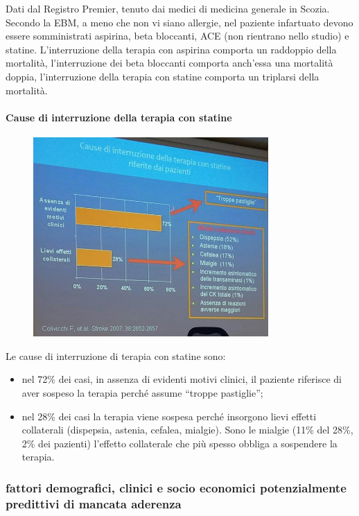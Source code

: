 Dati dal Registro Premier, tenuto dai medici di medicina generale in
Scozia. Secondo la EBM, a meno che non vi siano allergie, nel paziente
infartuato devono essere somministrati aspirina, beta bloccanti, ACE
(non rientrano nello studio) e statine. L'interruzione della terapia con
aspirina comporta un raddoppio della mortalità, l'interruzione dei beta
bloccanti comporta anch'essa una mortalità doppia, l'interruzione della
terapia con statine comporta un triplarsi della mortalità.

\paragraph{Cause di interruzione della terapia con statine}

\begin{figure}[!ht]
\centering
	\includegraphics[width=0.8\textwidth]{41/image4.jpeg}
	\end{figure}
	
Le cause di interruzione di terapia con statine sono:

\begin{itemize}
\item
  nel 72\% dei casi, in assenza di evidenti motivi clinici, il paziente
  riferisce di aver sospeso la terapia perché assume ``troppe
  pastiglie'';
\item
  nel 28\% dei casi la terapia viene sospesa perché insorgono lievi
  effetti collaterali (dispepsia, astenia, cefalea, mialgie). Sono le
  mialgie (11\% del 28\%, 2\% dei pazienti) l'effetto collaterale che
  più spesso obbliga a sospendere la terapia.
\end{itemize}

\subsubsection{fattori demografici, clinici e socio economici potenzialmente predittivi di mancata aderenza}

